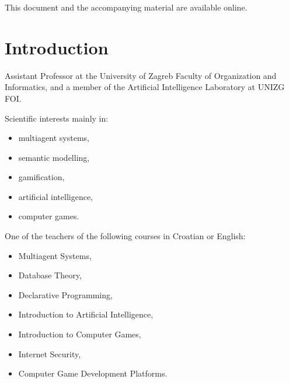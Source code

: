 
\begin{frame}
    \begin{multicols}{2}
        \centering
        
        \begin{minipage}[b]{0.42\linewidth}
            This document and the accompanying material are available online.\hfill\href{https://github.com/AILab-FOI/MAGO/tree/main/Documents/241119\%20DSC\%20Europe}{\faExternalLink}
        \end{minipage}

        \columnbreak

    \end{multicols}
\end{frame}

\section{Introduction}

\begin{frame}{\insertsection}
    \begin{multicols}{2}
        Assistant Professor at the University of Zagreb \alert{Faculty of Organization and Informatics}, and a member of the Artificial Intelligence Laboratory at UNIZG FOI.

        \columnbreak
        
        Scientific interests mainly in:
        \begin{itemize}
            \item multiagent systems,
            \item semantic modelling,
            \item gamification,
            \item artificial intelligence,
            \item computer games.
        \end{itemize}
    \end{multicols}
\end{frame}

\begin{frame}{\insertsection}
    One of the teachers of the following courses in Croatian or English:
    \begin{multicols}{2}
        \begin{itemize}
            \item Multiagent Systems,
            \item Database Theory,
            \item Declarative Programming,
            \item Introduction to Artificial Intelligence,
            \item Introduction to Computer Games,
            \item Internet Security,
            \item Computer Game Development Platforms.
        \end{itemize}
    \end{multicols}
\end{frame}

